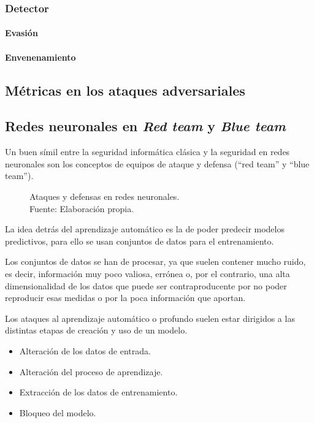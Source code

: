 \subsubsection{Detector}
\paragraph{Evasión}
\paragraph{Envenenamiento}

\subsection{Métricas en los ataques adversariales}

\subsection{Redes neuronales en \textit{Red team} y \textit{Blue team}}

Un buen símil entre la seguridad informática clásica y la seguridad en redes neuronales son los conceptos de equipos de ataque y defensa (``red team'' y ``blue team'').

\begin{figure}[H]
    \centering
    \centerline{}
    \caption{Ataques y defensas en redes neuronales.\\Fuente: Elaboración propia.}
    \label{fig:art-for-red-and-blue-teams}
\end{figure}

La idea detrás del aprendizaje automático es la de poder predecir modelos predictivos, para ello se usan conjuntos de datos para el entrenamiento.

Los conjuntos de datos se han de procesar, ya que suelen contener mucho ruido, es decir, información muy poco valiosa, errónea o, por el contrario, una alta dimensionalidad de los datos que puede ser contraproducente por no poder reproducir esas medidas o por la poca información que aportan.

Los ataques al aprendizaje automático o profundo suelen estar dirigidos a las distintas etapas de creación y uso de un modelo.

\begin{itemize}
    \item Alteración de los datos de entrada.
    \item Alteración del proceso de aprendizaje.
    \item Extracción de los datos de entrenamiento.
    \item Bloqueo del modelo.
\end{itemize}

